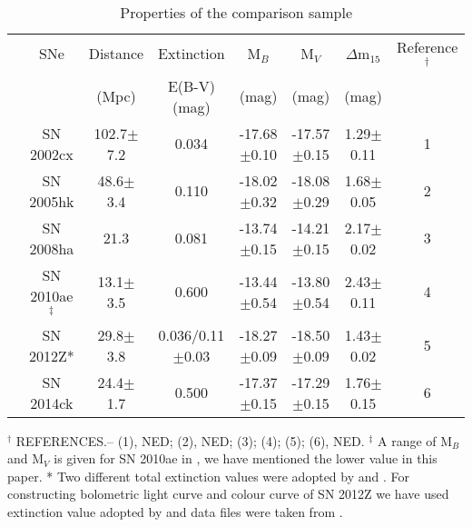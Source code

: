 \begin{table*}
\caption{Properties of the comparison sample }
\centering
\smallskip
\begin{tabular}{c c c c c c c c }
\hline \hline
                       & SNe         & Distance      & Extinction &  M$_B$             & M$_V$            & $\Delta$m$_{15}$ &  Reference$^\dagger$  \\
                       &             & (Mpc)         & E(B-V)(mag)     &  (mag)             & (mag)            & (mag)                   \\
\hline
                       
                       & SN 2002cx   & 102.7$\pm$7.2 & 0.034      & -17.68$\pm$0.10    & -17.57$\pm$0.15  & 1.29$\pm$0.11    &  1   \\
                       & SN 2005hk   & 48.6$\pm$3.4  & 0.110      & -18.02$\pm$0.32    & -18.08$\pm$0.29  & 1.68$\pm$0.05    &  2   \\
                       & SN 2008ha   & 21.3          & 0.081      & -13.74$\pm$0.15    & -14.21$\pm$0.15  & 2.17$\pm$0.02    &  3   \\
		       & SN 2010ae$^\ddagger$   & 13.1$\pm$3.5  & 0.600      & -13.44$\pm$0.54    & -13.80$\pm$0.54  & 2.43$\pm$0.11    &  4   \\
                       & SN 2012Z{*}    & 29.8$\pm$3.8  & 0.036/0.11$\pm$0.03      & -18.27$\pm$0.09    & -18.50$\pm$0.09  & 1.43$\pm$0.02    &  5   \\
                       & SN 2014ck   & 24.4$\pm$1.7  & 0.500      & -17.37$\pm$0.15    & -17.29$\pm$0.15  & 1.76$\pm$0.15    &  6   \\
 \hline                                                                                   
\end{tabular}
\newline
$^\dagger$ REFERENCES.-- (1)\cite{2003PASP..115..453L}, NED; (2)\cite{2008ApJ...680..580S,2007PASP..119..360P}, NED; (3)\cite{2009AJ....138..376F}; (4)\cite{2014A&A...561A.146S}; (5)\cite{2015A&A...573A...2S,2015ApJ...806..191Y}; (6)\cite{2016MNRAS.459.1018T}, NED.
$^\ddagger$ A range of M$_B$ and M$_V$ is given for SN 2010ae in \cite{2014A&A...561A.146S}, we have mentioned the lower value in this paper. * Two different total extinction values were adopted by \cite{2015ApJ...806..191Y} and \cite{2015A&A...573A...2S}. For constructing bolometric light curve and colour curve of SN 2012Z we have used extinction value adopted by \cite{2015A&A...573A...2S} and data files were taken from \cite{2015ApJ...806..191Y}.        
\label{tab:photometric_parameters_different_SNe}
\end{table*}
